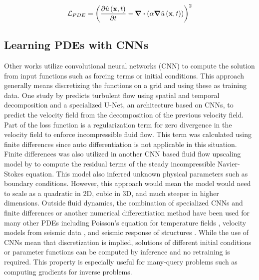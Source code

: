 \begin{equation}\label{eq:heat_pinn_loss}
    \mathcal{L}_{PDE}={\left(\pdv{\hat{u}\left(\vb{x},t\right)}{t}-\divergence{\left(\alpha \gradient \hat{u}\left(\vb{x},t\right)\right)}\right)}^2
\end{equation}
\subsection*{Learning PDEs with CNNs}
Other works utilize convolutional neural networks (CNN) to compute the solution from input functions such as forcing terms or initial conditions. This approach generally means discretizing the functions on a grid and using these as training data. One study by \textcite{wangPhysicsinformedDeepLearning2020} predicts turbulent flow using spatial and temporal decomposition and a specialized U-Net, an architecture based on CNNs, to predict the velocity field from the decomposition of the previous velocity field. Part of the loss function is a regularization term for zero divergence in the velocity field to enforce incompressible fluid flow. This term was calculated using finite differences since auto differentiation is not applicable in this situation. Finite differences was also utilized in another CNN based fluid flow upscaling model by \textcite{gaoSuperresolutionDenoisingFluid2021} to compute the residual terms of the steady incompressible Navier-Stokes equation. This model also inferred unknown physical parameters such as boundary conditions. However, this approach would mean the model would need to scale as a quadratic in 2D, cubic in 3D, and much steeper in higher dimensions. Outside fluid dynamics, the combination of specialized CNNs and finite differences or another numerical differentiation method have been used for many other PDEs including Poisson's equation for temperature fields \autocite{zhaoPhysicsinformedConvolutionalNeural2023, gaoPhyGeoNetPhysicsinformedGeometryadaptive2021}, velocity models from seismic data \autocite{mullerDeepPretrainedFWI2023}, and seismic response of structures \autocite{zhangPhysicsguidedConvolutionalNeural2020,niMultiEndPhysicsInformedDeep2022}. While the use of CNNs mean that discretization is implied, solutions of different initial conditions or parameter functions can be computed by inference and no retraining is required. This property is especially useful for many-query problems such as computing gradients for inverse problems.

